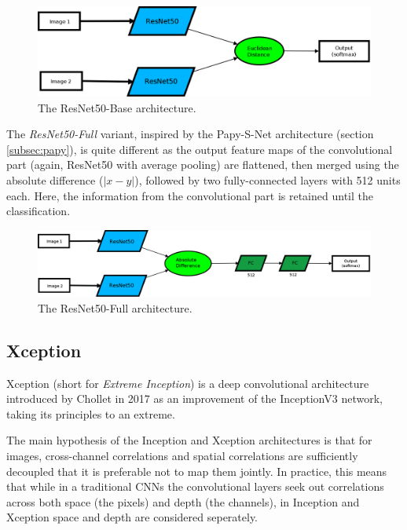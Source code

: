 \documentclass[11pt]{report}
\begin{document}
\begin{figure}[H]
\centering\includegraphics[width=13cm]{diaresbase.png}
\caption{The ResNet50-Base architecture.}
\label{resnet50base}
\end{figure}

The \emph{ResNet50-Full} variant, inspired by the Papy-S-Net architecture (section \ref{subsec:papy}), is quite different as the output feature maps of the convolutional part (again, ResNet50 with average pooling) are flattened, then merged using the absolute difference ($|x-y|$), followed by two fully-connected layers with 512 units each. Here, the information from the convolutional part is retained until the classification.

\begin{figure}[H]
\centering\includegraphics[width=13cm]{diaresfull.png}
\caption{The ResNet50-Full architecture.}
\label{resnet50full}
\end{figure}

\subsection{Xception}\label{subsec:xception}

Xception (short for \emph{Extreme Inception}) is a deep convolutional architecture introduced by Chollet \cite{cho17} in 2017 as an improvement of the InceptionV3 network, taking its principles to an extreme.\newline

The main hypothesis of the Inception and Xception architectures is that for images, cross-channel correlations and spatial correlations are sufficiently decoupled that it is preferable not to map them jointly. In practice, this means that while in a traditional CNNs the convolutional layers seek out correlations across both space (the pixels) and depth (the channels), in Inception and Xception space and depth are considered seperately.\newline
\end{document}
